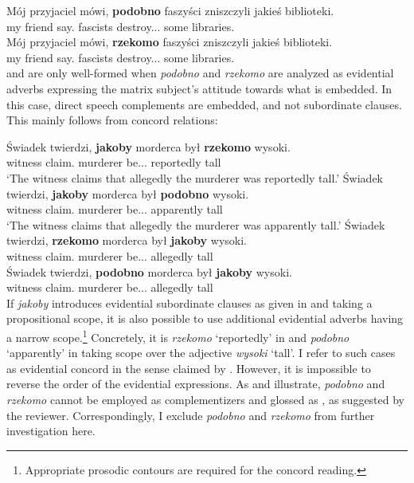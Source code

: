 \documentclass[output=paper
,modfonts
,nonflat]{langsci/langscibook}
\begin{document}
\ea \ea \gll	*Mój przyjaciel mówi, \textbf{podobno} faszyści zniszczyli jakieś biblioteki.  \label{podobno} \\
		my friend say.{\thirdperson}{\sg} {\comp}  fascists destroy.{\lptcp}.{\vir}.{\pl} some libraries. \\
	\ex\gll	*Mój przyjaciel mówi, \textbf{rzekomo} faszyści zniszczyli jakieś biblioteki. \label{rzekomo} \\
		my friend say.{\thirdperson}{\sg} {\comp}  fascists destroy.{\lptcp}.{\vir}.{\pl} some libraries. \\
          \z\z
{} and  are only well-formed when \emph{podobno} and \emph{rzekomo} are analyzed as evidential adverbs expressing the matrix subject's attitude towards what is embedded. In this case, direct speech complements are embedded, and not subordinate clauses.  This mainly follows from concord relations:

\ea \ea \gll	Świadek twierdzi, \textbf{jakoby} morderca był \textbf{rzekomo} wysoki. \label{tall1} \\
		witness claim.{\thirdperson}{\sg} {\comp} murderer be.{\lptcp}.{\thirdperson}{\sg}.{\masc} reportedly tall \\
	\glt	 `The witness claims that allegedly the murderer was reportedly tall.'
	\ex\gll	Świadek twierdzi, \textbf{jakoby} morderca był \textbf{podobno} wysoki. \label{tall2} \\
		witness claim.{\thirdperson}{\sg} {\comp} murderer be.{\lptcp}.{\thirdperson}{\sg}.{\masc} apparently tall \\
	\glt	 `The witness claims that allegedly the murderer was apparently tall.'
	\ex\gll	*Świadek twierdzi, \textbf{rzekomo} morderca był \textbf{jakoby} wysoki. \label{tall3} \\
		witness claim.{\thirdperson}{\sg} {\comp} murderer be.{\lptcp}.{\thirdperson}{\sg}.{\masc} allegedly tall \\
	\ex\gll	*Świadek twierdzi, \textbf{podobno} morderca był \textbf{jakoby} wysoki. \label{tall4} \\
		witness claim.{\thirdperson}{\sg} {\comp} murderer be.{\lptcp}.{\thirdperson}{\sg}.{\masc} allegedly tall \\
\z\z
If \emph{jakoby} introduces evidential subordinate clauses as given in  and  taking a propositional scope, it is also possible to use additional evidential adverbs having a narrow scope.\footnote{Appropriate prosodic contours are required for the concord reading.
}
Concretely, it is \emph{rzekomo}  `reportedly' in  and \emph{podobno} `apparently' in  taking scope over the adjective \emph{wysoki} `tall'. I refer to such cases as evidential concord in the sense claimed by \textcite{Schenner2007}. However, it is impossible to reverse the order of the evidential expressions. As  and  illustrate, \emph{podobno} and \emph{rzekomo} cannot be employed as complementizers and glossed as {\comp}, as suggested by the reviewer. Correspondingly, I exclude \emph{podobno} and \emph{rzekomo} from further investigation here.
\end{document}
